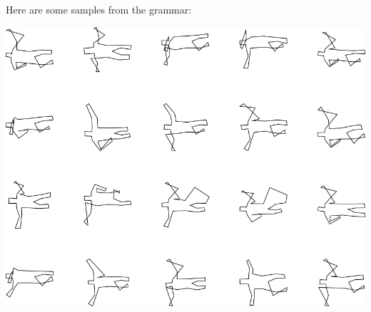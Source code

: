Here are some samples from the grammar:

\includegraphics[width=6in]{output/3.learning/incremental/gram.25.d/samples.png}

